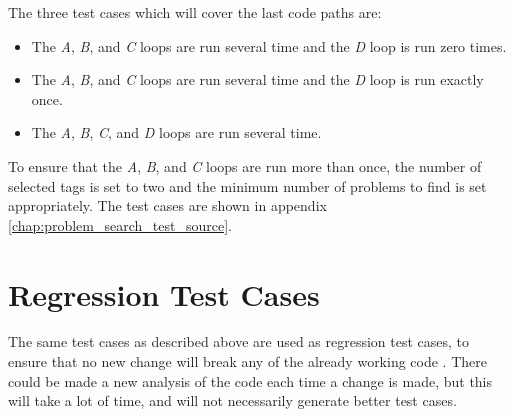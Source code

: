 The three test cases which will cover the last code paths are:
\begin{itemize}
	\item The \textit{A}, \textit{B}, and \textit{C} loops are run several time and the \textit{D} loop is run zero times.
	\item The \textit{A}, \textit{B}, and \textit{C} loops are run several time and the \textit{D} loop is run exactly once.
	\item The \textit{A}, \textit{B}, \textit{C}, and \textit{D} loops are run several time.
\end{itemize}
To ensure that the \textit{A}, \textit{B}, and \textit{C} loops are run more than once, the number of selected tags is set to two and the minimum number of problems to find is set appropriately.
The test cases are shown in appendix \ref{chap:problem_search_test_source}.

\section{Regression Test Cases}
\label{sec:regression_problem_search}
The same test cases as described above are used as regression test cases, to ensure that no new change will break any of the already working code .
There could be made a new analysis of the code each time a change is made, but this will take a lot of time, and will not necessarily generate better test cases.
